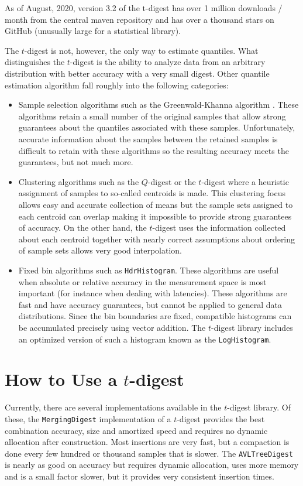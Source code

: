 \documentclass[preprint,12pt, a4paper]{elsarticle}
\begin{document}
As of August, 2020, version 3.2 of the t-digest has over 1 million downloads / month from the central maven repository \cite{maven-stats} and has over a thousand stars on GitHub (unusually large for a statistical library).

The $t$-digest is not, however, the only way to estimate quantiles.  What distinguishes the $t$-digest is the ability to analyze data from an arbitrary distribution with better accuracy with a very small digest. Other quantile estimation algorithm fall roughly into the following categories:
\begin{itemize}
\item Sample selection algorithms such as the Greenwald-Khanna algorithm \cite{Greenwald-space-efficient-online-quantiles}. These algorithms retain a small number of the original samples that allow strong guarantees about the quantiles associated with these samples. Unfortunately, accurate information about the samples between the retained samples is difficult to retain with these algorithms so the resulting accuracy meets the guarantees, but not much more.
\item Clustering algorithms such as the $Q$-digest or the $t$-digest where a heuristic assignment of samples to so-called centroids is made. This clustering focus allows easy and accurate collection of means but the sample sets assigned to each centroid can overlap making it impossible to provide strong guarantees of accuracy. On the other hand, the $t$-digest uses the information collected about each centroid together with nearly correct assumptions about ordering of sample sets allows very good interpolation.
\item Fixed bin algorithms such as \texttt{Hdr\-Histogram}\cite{hdr-histogram}. These algorithms are useful when absolute or relative accuracy in the measurement space is most important (for instance when dealing with latencies). These algorithms are fast and have accuracy guarantees, but cannot be applied to general data distributions. Since the bin boundaries are fixed, compatible histograms can be accumulated precisely using vector addition. The $t$-digest library includes an optimized version of such a histogram known as the \texttt{LogHistogram}.
\end{itemize} 
\section{How to Use a $t$-digest}
Currently, there are several implementations available in the $t$-digest library. Of these, the \texttt{MergingDigest} implementation of a $t$-digest provides the best combination accuracy, size and amortized speed and requires no dynamic allocation after construction. Most insertions are very fast, but a compaction is done every few hundred or thousand samples that is slower. The \texttt{AVLTreeDigest} is nearly as good on accuracy but requires dynamic allocation, uses more memory and is a small factor slower, but it provides very consistent insertion times. 
\end{document}
